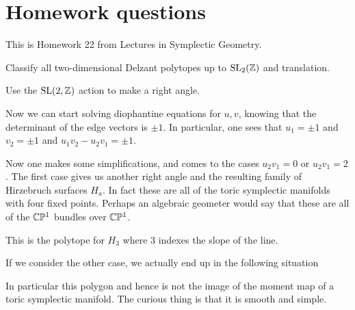 \documentclass[12pt]{article}
\begin{document}
\section{Homework questions}
This is Homework 22 from Lectures in Symplectic Geometry.
\begin{example}
	Classify all two-dimensional Delzant polytopes up to $\operatorname{SL}_2(\mathbb{Z})$ and translation.

	\hfill

	Use the $\operatorname{SL}(2,\mathbb{Z})$ action to make a right angle.
	\begin{center}
	\end{center}
	Now we can start solving diophantine equations for $u,v$, knowing that the determinant of the  edge
	vectors is $\pm 1$. In particular, one sees that $u_1 = \pm 1$ and $v_2 = \pm 1$ and $u_1v_2 - u_2v_1 = \pm 1$.

	\hfill

	Now one makes some simplifications, and comes to the cases $u_2v_1 = 0$ or $u_2v_1 = 2$. The first case
	gives us another right angle and the resulting family of Hirzebruch surfaces $H_a$. In fact
	these are all of the toric symplectic manifolds with four fixed points. Perhaps an algebraic
	geometer would say that these are all of the $\mathbb{C}\mathbb{P}^1$ bundles over $\mathbb{C}\mathbb{P}^1$.
	\begin{center}

		This is the polytope for $H_3$ where $3$ indexes the slope of the line.
	\end{center}

	If we consider the other case, we actually end up in the following situation \begin{center}
	\end{center}
	In particular this polygon  and hence is not the
	image of the moment map of a toric symplectic manifold.
	The curious thing is that it is smooth and simple. 
\end{example}
\end{document}
